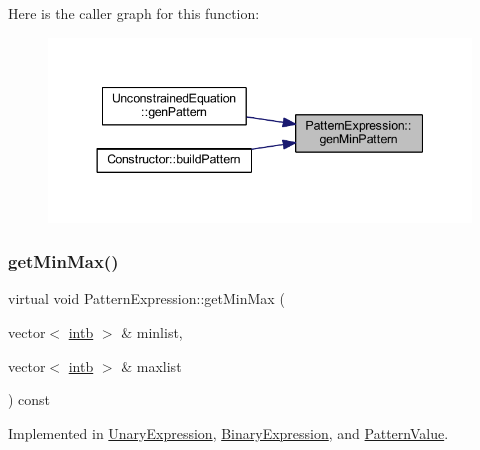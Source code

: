 Here is the caller graph for this function\+:
\nopagebreak
\begin{figure}[H]
\begin{center}
\leavevmode
\includegraphics[width=344pt]{class_pattern_expression_a1dc2d0c07f64fdab9da6c0849e992b50_icgraph}
\end{center}
\end{figure}
\mbox{\label{class_pattern_expression_a4ceb88e89308ac58bf1af4174228f3a0}} 
\subsubsection{\texorpdfstring{getMinMax()}{getMinMax()}}
{\footnotesize\ttfamily virtual void Pattern\+Expression\+::get\+Min\+Max (\begin{DoxyParamCaption}\item[{vector$<$ \mbox{\hyperlink{types_8h_aa925ba3e627c2df89d5b1cfe84fb8572}{intb}} $>$ \&}]{minlist,  }\item[{vector$<$ \mbox{\hyperlink{types_8h_aa925ba3e627c2df89d5b1cfe84fb8572}{intb}} $>$ \&}]{maxlist }\end{DoxyParamCaption}) const\hspace{0.3cm}{\ttfamily [pure virtual]}}



Implemented in \mbox{\hyperlink{class_unary_expression_a1fec3bdcd57cc6bca29f8a00f0e7c406}{Unary\+Expression}}, \mbox{\hyperlink{class_binary_expression_afbce1a4f9e87f25ed8d52792b4d40425}{Binary\+Expression}}, and \mbox{\hyperlink{class_pattern_value_add81554f00ea23c27314f7699ef2b5f3}{Pattern\+Value}}.


